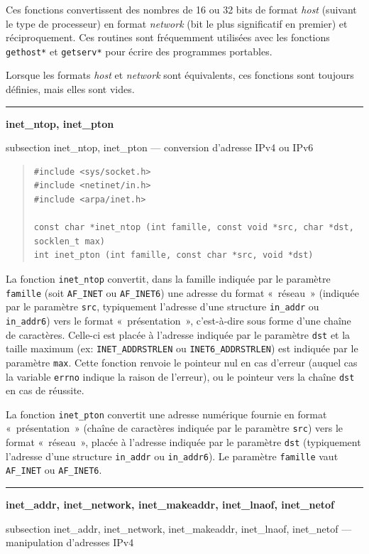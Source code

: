 \documentclass [twoside] {report}
\newcommand {\primitive} [1]
    {
	\phantomsection
	{\large \textbf {#1}}
	\addcontentsline {toc} {subsection} {#1}
    }
\newcommand {\separation}
    {
	\vspace {5mm}
	\nopagebreak
	\hrule
    }
\begin{document}
Ces fonctions convertissent des nombres de 16 ou 32 bits de format {\em
host} (suivant le type de processeur) en format \emph {network} (bit le
plus significatif en premier) et réciproquement.  Ces routines sont
fréquemment utilisées avec les fonctions \texttt {gethost*} et
\texttt {getserv*} pour écrire des programmes portables.

Lorsque les formats \emph {host} et \emph {network} sont équivalents, ces
fonctions sont toujours définies, mais elles sont vides.


\separation
\primitive {inet\_ntop, inet\_pton} --- conversion d'adresse IPv4 ou IPv6

\begin {quote}
\begin {verbatim}
#include <sys/socket.h>
#include <netinet/in.h>
#include <arpa/inet.h>

const char *inet_ntop (int famille, const void *src, char *dst, socklen_t max)
int inet_pton (int famille, const char *src, void *dst)
\end{verbatim}
\end {quote}

La fonction \texttt {inet\_ntop} convertit, dans la famille indiquée
par le paramètre \texttt {famille} (soit \texttt {AF\_INET} ou
\texttt {AF\_INET6}) une adresse du format «~réseau~» (indiquée par
le paramètre \texttt {src}, typiquement l'adresse d'une structure
\texttt {in\_addr} ou \texttt {in\_addr6}) vers le format
«~présentation~», c'est-à-dire sous forme d'une chaîne de caractères.
Celle-ci est placée à l'adresse indiquée par le paramètre \texttt
{dst} et la taille maximum (ex: \texttt {INET\_ADDRSTRLEN} ou \texttt
{INET6\_ADDRSTRLEN}) est indiquée par le paramètre \texttt {max}.
Cette fonction renvoie le pointeur nul en cas d'erreur (auquel cas
la variable \texttt {errno} indique la raison de l'erreur), ou le
pointeur vers la chaîne \texttt {dst} en cas de réussite.

La fonction \texttt {inet\_pton} convertit une adresse numérique
fournie en format «~présentation~» (chaîne de caractères indiquée
par le paramètre \texttt {src}) vers le format «~réseau~», placée
à l'adresse indiquée par le paramètre \texttt {dst} (typiquement
l'adresse d'une structure \texttt {in\_addr} ou \texttt {in\_addr6}).
Le paramètre \texttt {famille} vaut \texttt {AF\_INET} ou \texttt
{AF\_INET6}.


\separation
\primitive {inet\_addr, inet\_network, inet\_makeaddr, inet\_lnaof,
inet\_netof} --- manipulation d'adresses IPv4
\end{document}
